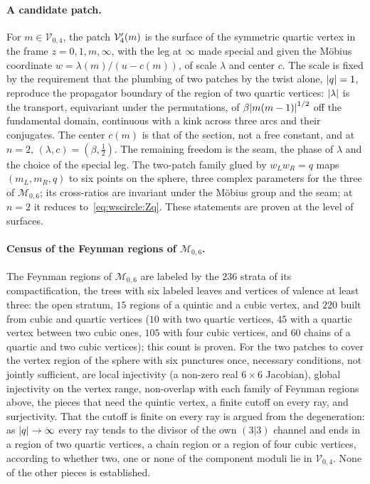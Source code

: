 \paragraph{A candidate patch.}
For $m \in \mathcal V_{0,4}$, the patch $\mathcal{V}_{4}'(m)$ is the surface of the symmetric quartic vertex in the frame $z = 0, 1, m, \infty$, with the leg at $\infty$ made special and given the Möbius coordinate $w = \lambda(m) / (u - c(m))$, of scale $\lambda$ and center $c$.
The scale is fixed by the requirement that the plumbing of two patches by the twist alone, ${|q|} = 1$, reproduce the propagator boundary of the region of two quartic vertices: ${|\lambda|}$ is the transport, equivariant under the permutations, of $\beta {|m (m - 1)|}^{1/2}$ off the fundamental domain, continuous with a kink across three arcs and their conjugates.
The center $c(m)$ is that of the section, not a free constant, and at $n = 2$, $(\lambda, c) = (\beta, \tfrac{1}{2})$.
The remaining freedom is the seam, the phase of $\lambda$ and the choice of the special leg.
The two-patch family glued by $w_L w_R = q$ maps $(m_L, m_R, q)$ to six points on the sphere, three complex parameters for the three of $\mathcal M_{0,6}$; its cross-ratios are invariant under the Möbius group and the seam; at $n = 2$ it reduces to~\eqref{eq:wscircle:Zq}.
These statements are proven at the level of surfaces.

\paragraph{Census of the Feynman regions of \texorpdfstring{$\mathcal M_{0,6}$}{M06}.}
The Feynman regions of $\mathcal M_{0,6}$ are labeled by the $236$ strata of its compactification, the trees with six labeled leaves and vertices of valence at least three: the open stratum, $15$ regions of a quintic and a cubic vertex, and $220$ built from cubic and quartic vertices ($10$ with two quartic vertices, $45$ with a quartic vertex between two cubic ones, $105$ with four cubic vertices, and $60$ chains of a quartic and two cubic vertices); this count is proven.
For the two patches to cover the vertex region of the sphere with six punctures once, necessary conditions, not jointly sufficient, are local injectivity (a non-zero real $6 \times 6$ Jacobian), global injectivity on the vertex range, non-overlap with each family of Feynman regions above, the pieces that need the quintic vertex, a finite cutoff on every ray, and surjectivity.
That the cutoff is finite on every ray is argued from the degeneration: as ${|q|} \to \infty$ every ray tends to the divisor of the own $(3|3)$ channel and ends in a region of two quartic vertices, a chain region or a region of four cubic vertices, according to whether two, one or none of the component moduli lie in $\mathcal V_{0,4}$.
None of the other pieces is established.

